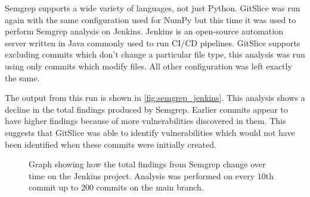 Semgrep supports a wide variety of languages, not just Python.
GitSlice was run again with the same configuration used for NumPy but this time it was used to perform Semgrep analysis on Jenkins.
Jenkins is an open-source automation server written in Java commonly used to run CI/CD pipelines.
GitSlice supports excluding commits which don't change a particular file type, this analysis was run using only commits which modify  files.
All other configuration was left exactly the same.

The output from this run is shown in \autoref{fig:semgrep_jenkins}.
This analysis shows a decline in the total findings produced by Semgrep.
Earlier commits appear to have higher findings because of more vulnerabilities discovered in them.
This suggests that GitSlice was able to identify vulnerabilities which would not have been identified when these commits were initially created.

\begin{figure}
    \centering
    \caption{Graph showing how the total findings from Semgrep change over time on the Jenkins project.  Analysis was performed on every $10$th commit up to $200$ commits on the main branch.}
    \label{fig:semgrep_jenkins}
\end{figure}
